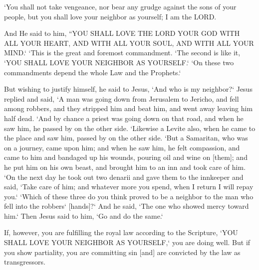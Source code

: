 \begin{scripture}[Leviticus 19:18]
    `You shall not take vengeance, nor bear any grudge against the sons of your people, but you shall love your neighbor as yourself; I am the LORD.
\end{scripture}

\begin{scripture}[Matthew 22:37-40]
    And He said to him, ``YOU SHALL LOVE THE LORD YOUR GOD WITH ALL YOUR HEART, AND WITH ALL YOUR SOUL, AND WITH ALL YOUR MIND.`
    `This is the great and foremost commandment.
    `The second is like it, `YOU SHALL LOVE YOUR NEIGHBOR AS YOURSELF.`
    `On these two commandments depend the whole Law and the Prophets.`
\end{scripture}

\begin{scripture}[Luke 10:29-37]
    But wishing to justify himself, he said to Jesus, `And who is my neighbor?`
    Jesus replied and said, `A man was going down from Jerusalem to Jericho, and fell among robbers, and they stripped him and beat him, and went away leaving him half dead.
    `And by chance a priest was going down on that road, and when he saw him, he passed by on the other side.
    `Likewise a Levite also, when he came to the place and saw him, passed by on the other side.
    `But a Samaritan, who was on a journey, came upon him; and when he saw him, he felt compassion,
    and came to him and bandaged up his wounds, pouring oil and wine on [them]; and he put him on his own beast, and brought him to an inn and took care of him.
    `On the next day he took out two denarii and gave them to the innkeeper and said, `Take care of him; and whatever more you spend, when I return I will repay you.`
    `Which of these three do you think proved to be a neighbor to the man who fell into the robbers` [hands]?`
    And he said, `The one who showed mercy toward him.` Then Jesus said to him, `Go and do the same.`
\end{scripture}

\begin{scripture}[James 2:8-9]
    If, however, you are fulfilling the royal law according to the Scripture, `YOU SHALL LOVE YOUR NEIGHBOR AS YOURSELF,` you are doing well.
    But if you show partiality, you are committing sin [and] are convicted by the law as transgressors.
\end{scripture}


